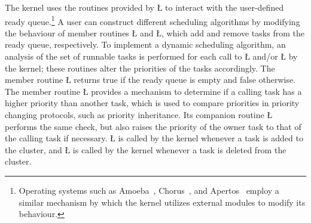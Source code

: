 \documentclass[openright,twoside]{report}
\begin{document}
%
%
%
%
The \uC kernel uses the routines provided by \LGinlinetrue\LGbegin\lgrinde\L{}\endlgrinde\LGend{} to interact with the user-defined ready queue.\footnote{Operating systems such as Amoeba~\cite{Tanenbaum90}, Chorus~\cite{Rozier88}, and Apertos~\cite{Yokote92} employ a similar mechanism by which the kernel utilizes external modules to modify its behaviour.}
A user can construct different scheduling algorithms by modifying the behaviour of member routines \LGinlinetrue\LGbegin\lgrinde\L{}\endlgrinde\LGend{} and \LGinlinetrue\LGbegin\lgrinde\L{}\endlgrinde\LGend{}, which add and remove tasks from the ready queue, respectively.
To implement a dynamic scheduling algorithm, an analysis of the set of runnable tasks is performed for each call to \LGinlinetrue\LGbegin\lgrinde\L{}\endlgrinde\LGend{} and/or \LGinlinetrue\LGbegin\lgrinde\L{}\endlgrinde\LGend{} by the kernel;
these routines alter the priorities of the tasks accordingly.
The member routine \LGinlinetrue\LGbegin\lgrinde\L{}\endlgrinde\LGend{} returns true if the ready queue is empty and false otherwise.
The member routine \LGinlinetrue\LGbegin\lgrinde\L{}\endlgrinde\LGend{} provides a mechanism to determine if a calling task has a higher priority than another task, which is used to compare priorities in priority changing protocols, such as priority inheritance.
Its companion routine \LGinlinetrue\LGbegin\lgrinde\L{}\endlgrinde\LGend{} performs the same check, but also raises the priority of the owner task to that of the calling task if necessary.
\LGinlinetrue\LGbegin\lgrinde\L{}\endlgrinde\LGend{} is called by the kernel whenever a task is added to the cluster, and \LGinlinetrue\LGbegin\lgrinde\L{}\endlgrinde\LGend{} is called by the kernel whenever a task is deleted from the cluster.
\end{document}
